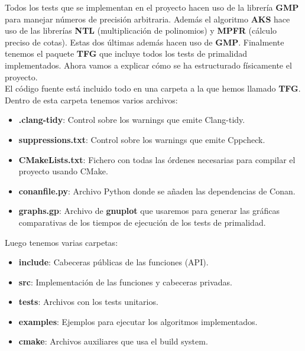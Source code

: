 Todos los tests que se implementan en el proyecto hacen uso de la librería \textbf{GMP} para manejar números de precisión arbitraria. Además el algoritmo \textbf{AKS} hace uso de las librerías \textbf{NTL} (multiplicación de polinomios) y \textbf{MPFR} (cálculo preciso de cotas). Estas dos últimas además hacen uso de \textbf{GMP}. Finalmente tenemos el paquete \textbf{TFG} que incluye todos los tests de primalidad implementados. Ahora vamos a explicar cómo se ha estructurado físicamente el proyecto.\\

El código fuente está incluido todo en una carpeta a la que hemos llamado \textbf{TFG}. Dentro de esta carpeta tenemos varios archivos:

\begin{itemize}
	\item \textbf{.clang-tidy}: Control sobre los warnings que emite Clang-tidy.
	
	\item \textbf{suppressions.txt}: Control sobre los warnings que emite Cppcheck.
	
	\item \textbf{CMakeLists.txt}: Fichero con todas las órdenes necesarias para compilar el proyecto usando CMake.

	\item \textbf{conanfile.py}: Archivo Python donde se añaden las dependencias de Conan.
	
	\item \textbf{graphs.gp}: Archivo de \textbf{gnuplot} que usaremos para generar las gráficas comparativas de los tiempos de ejecución de los tests de primalidad.
\end{itemize}

Luego tenemos varias carpetas:

\begin{itemize}
	\item \textbf{include}: Cabeceras públicas de las funciones (API).
	
	\item \textbf{src}: Implementación de las funciones y cabeceras privadas.
	
	\item \textbf{tests}: Archivos con los tests unitarios.
	
	\item \textbf{examples}: Ejemplos para ejecutar los algoritmos implementados.
	
	\item \textbf{cmake}: Archivos auxiliares que usa el build system.
\end{itemize}

